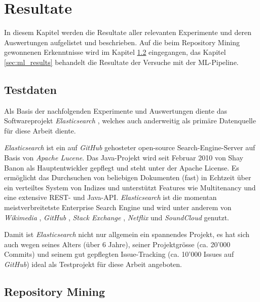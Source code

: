 \documentclass[10pt, a4paper]{article}
\begin{document}
\section{Resultate}

In diesem Kapitel werden die Resultate aller relevanten Experimente und deren Auswertungen aufgelistet und beschrieben. Auf die beim Repository Mining gewonnenen Erkenntnisse wird im Kapitel \ref{sec:statistics} eingegangen, das Kapitel \ref{sec:ml_results} behandelt die Resultate der Versuche mit der \ac{ML}-Pipeline.

\subsection{Testdaten}
Als Basis der nachfolgenden Experimente und Auswertungen diente das Softwareprojekt \emph{Elasticsearch} \cite{elasticsearchhomepage}, welches auch anderweitig als primäre Datenquelle für diese Arbeit diente.

\emph{Elasticsearch} ist ein auf \emph{GitHub} gehosteter open-source Search-Engine-Server \cite{elasticsearchgithub} auf Basis von \emph{Apache Lucene}. Das Java-Projekt wird seit Februar 2010 \cite{elasticsearchrelease} von Shay Banon als Hauptentwickler gepflegt und steht unter der Apache License. Es ermöglicht das Durchsuchen von beliebigen Dokumenten (fast) in Echt\-zeit über ein verteiltes System von Indizes und unterstützt Features wie Multitenancy und eine extensive \acs{REST}- und Java-\acs{API}. \emph{Elasticsearch} ist die momentan meistverbreitetste Enterprise Search Engine \cite{dbsearchengineranking} und wird unter anderem von 
\emph{Wikimedia}		\cite{elasticsearchinwikimedia}, 
\emph{GitHub}			\cite{elasticsearchingithub}, 
\emph{Stack Exchange}	\cite{elasticsearchinstackexchange}, 
\emph{Netflix}			\cite{elasticsearchinnetflix} und
\emph{Sound\-Cloud}		\cite{elasticsearchinsoundcloud}
genutzt.

Damit ist \emph{Elasticsearch} nicht nur allgemein ein spannendes Projekt, es hat sich auch wegen seines Alters (über 6 Jahre), seiner Projektgrösse (ca. 20'000 Commits) und seinem gut gepflegten Issue-Tracking (ca. 10'000 Issues auf \emph{GitHub}) ideal als Testprojekt für diese Arbeit angeboten.

\subsection{Repository Mining} \label{sec:statistics}
\end{document}
